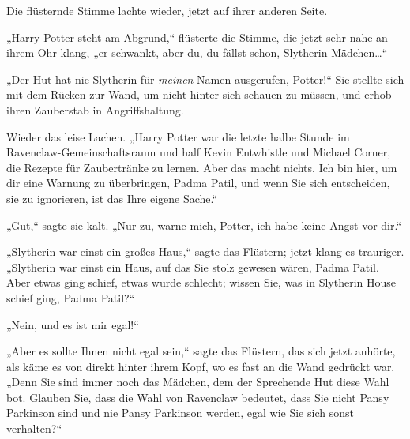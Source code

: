 Die flüsternde Stimme lachte wieder, jetzt auf ihrer anderen Seite.

„Harry Potter steht am Abgrund,“ flüsterte die Stimme, die jetzt sehr nahe an ihrem Ohr klang, „er schwankt, aber du, du fällst schon, Slytherin-Mädchen…“

„Der Hut hat nie Slytherin für \emph{meinen} Namen ausgerufen, Potter!“ Sie stellte sich mit dem Rücken zur Wand, um nicht hinter sich schauen zu müssen, und erhob ihren Zauberstab in Angriffshaltung.

Wieder das leise Lachen. „Harry Potter war die letzte halbe Stunde im Ravenclaw-Gemeinschaftsraum und half Kevin Entwhistle und Michael Corner, die Rezepte für Zaubertränke zu lernen. Aber das macht nichts. Ich bin hier, um dir eine Warnung zu überbringen, Padma Patil, und wenn Sie sich entscheiden, sie zu ignorieren, ist das Ihre eigene Sache.“

„Gut,“ sagte sie kalt. „Nur zu, warne mich, Potter, ich habe keine Angst vor dir.“

„Slytherin war einst ein großes Haus,“ sagte das Flüstern; jetzt klang es trauriger. „Slytherin war einst ein Haus, auf das Sie stolz gewesen wären, Padma Patil. Aber etwas ging schief, etwas wurde schlecht; wissen Sie, was in Slytherin House schief ging, Padma Patil?“

„Nein, und es ist mir egal!“

„Aber es sollte Ihnen nicht egal sein,“ sagte das Flüstern, das sich jetzt anhörte, als käme es von direkt hinter ihrem Kopf, wo es fast an die Wand gedrückt war. „Denn Sie sind immer noch das Mädchen, dem der Sprechende Hut diese Wahl bot. Glauben Sie, dass die Wahl von Ravenclaw bedeutet, dass Sie nicht Pansy Parkinson sind und nie Pansy Parkinson werden, egal wie Sie sich sonst verhalten?“

